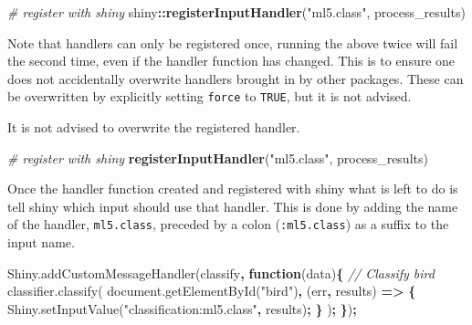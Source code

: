\documentclass[
  10pt,
]{krantz}
\makeatletter
\newenvironment{Shaded}{\begin{snugshade}}{\end{snugshade}}
\newcommand{\AttributeTok}[1]{\textcolor[rgb]{0.61,0.61,0.61}{#1}}
\newcommand{\CommentTok}[1]{\textcolor[rgb]{0.37,0.37,0.37}{\textit{#1}}}
\newcommand{\KeywordTok}[1]{\textcolor[rgb]{0.27,0.27,0.27}{\textbf{#1}}}
\newcommand{\NormalTok}[1]{#1}
\newcommand{\OperatorTok}[1]{\textcolor[rgb]{0.43,0.43,0.43}{\textbf{#1}}}
\newcommand{\StringTok}[1]{\textcolor[rgb]{0.5,0.5,0.5}{#1}}
\newcommand{\VariableTok}[1]{\textcolor[rgb]{0,0,0}{#1}}
\newenvironment{kframe}{%
\medskip{}
\setlength{\fboxsep}{.8em}
 \def\at@end@of@kframe{}%
 \ifinner\ifhmode%
  \def\at@end@of@kframe{\end{minipage}}%
  \begin{minipage}{\columnwidth}%
 \fi\fi%
 \def\FrameCommand##1{\hskip\@totalleftmargin \hskip-\fboxsep
 \colorbox{shadecolor}{##1}\hskip-\fboxsep
     \hskip-\linewidth \hskip-\@totalleftmargin \hskip\columnwidth}%
 \MakeFramed {\advance\hsize-\width
   \@totalleftmargin\z@ \linewidth\hsize
   \@setminipage}}%
 {\par\unskip\endMakeFramed%
 \at@end@of@kframe}
\renewenvironment{Shaded}{\begin{kframe}}{\end{kframe}}
\newenvironment{rmdblock}[1]
  {
  \begin{itemize}
  \renewcommand{\labelitemi}{
    \raisebox{-.7\height}[0pt][0pt]{
      {\setkeys{Gin}{width=3em,keepaspectratio}\texttt{[image: images/\#1]}}
    }
  }
  \setlength{\fboxsep}{1em}
  \begin{kframe}
  \item
  }
  {
  \end{kframe}
  \end{itemize}
  }
\newenvironment{rmdnote}
  {\begin{rmdblock}{note}}
  {\end{rmdblock}}
\makeatother
\begin{document}
\begin{Shaded}
\begin{Highlighting}[]
\CommentTok{\# register with shiny}
\NormalTok{shiny}\OperatorTok{::}\KeywordTok{registerInputHandler}\NormalTok{(}\StringTok{"ml5.class"}\NormalTok{, process\_results)}
\end{Highlighting}
\end{Shaded}

Note that handlers can only be registered once, running the above twice will fail the second time, even if the handler function has changed. This is to ensure one does not accidentally overwrite handlers brought in by other packages. These can be overwritten by explicitly setting \texttt{force} to \texttt{TRUE}, but it is not advised.

\begin{rmdnote}
It is not advised to overwrite the registered handler.
\end{rmdnote}

\begin{Shaded}
\begin{Highlighting}[]
\CommentTok{\# register with shiny}
\KeywordTok{registerInputHandler}\NormalTok{(}\StringTok{"ml5.class"}\NormalTok{, process\_results)}
\end{Highlighting}
\end{Shaded}

Once the handler function created and registered with shiny what is left to do is tell shiny which input should use that handler. This is done by adding the name of the handler, \texttt{ml5.class}, preceded by a colon (\texttt{:ml5.class}) as a suffix to the input name.

\begin{Shaded}
\begin{Highlighting}[]
\VariableTok{Shiny}\NormalTok{.}\AttributeTok{addCustomMessageHandler}\NormalTok{(}\StringTok{\textquotesingle{}classify\textquotesingle{}}\OperatorTok{,} \KeywordTok{function}\NormalTok{(data)}\OperatorTok{\{}
  \CommentTok{// Classify bird}
  \VariableTok{classifier}\NormalTok{.}\AttributeTok{classify}\NormalTok{(}
    \VariableTok{document}\NormalTok{.}\AttributeTok{getElementById}\NormalTok{(}\StringTok{"bird"}\NormalTok{)}\OperatorTok{,}\NormalTok{ (err}\OperatorTok{,}\NormalTok{ results) }\KeywordTok{=>} \OperatorTok{\{}
      \VariableTok{Shiny}\NormalTok{.}\AttributeTok{setInputValue}\NormalTok{(}\StringTok{"classification:ml5.class"}\OperatorTok{,}\NormalTok{ results)}\OperatorTok{;}
    \OperatorTok{\}}
\NormalTok{  )}\OperatorTok{;}
\OperatorTok{\}}\NormalTok{)}\OperatorTok{;}
\end{Highlighting}
\end{Shaded}
\end{document}
